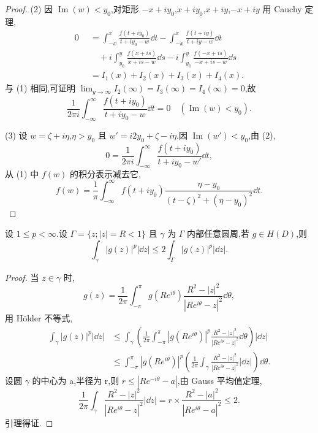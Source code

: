 \begin{proof}
(2) 因 $\operatorname{Im}(w) < y_{0}$,对矩形 $-x + iy_{0}$,$x + iy_{0}$,$x + iy$,$-x + iy$ 用 Cauchy 定理,
\begin{align*}
0 &= \int_{-x}^{x}\frac{f(t + iy_{0})}{t + iy_{0} - w}\dd t - \int_{-x}^{x}\frac{f(t + iy)}{t + iy - w}\dd t \\
&\quad + i\int_{y_{0}}^{y}\frac{f(x + is)}{x + is - w}\dd s - i\int_{y_{0}}^{y}\frac{f(-x + is)}{-x + is - w}\dd s \\
\quad &= I_{1}(x) + I_{2}(x) + I_{3}(x) + I_{4}(x).
\end{align*}
与 (1) 相同,可证明 $\lim_{y \to \infty}I_{2}(\infty) = I_{3}(\infty) = I_{4}(\infty) = 0$,故
\begin{equation*}
\frac{1}{2\pi i}\int_{-\infty}^{\infty}\frac{f(t + iy_{0})}{t + iy_{0} - w}\dd t = 0 \quad (\operatorname{Im}(w) < y_{0}).
\end{equation*}

(3) 设 $w = \zeta + i\eta$,$\eta > y_{0}$ 且 $w' = i2y_{0} + \zeta - i\eta$.因 $\operatorname{Im}(w') < y_{0}$,由 (2),
\begin{equation*}
0 = \frac{1}{2\pi i}\int_{-\infty}^{\infty}\frac{f(t + iy_{0})}{t + iy_{0} - w'}\dd t,
\end{equation*}
从 (1) 中 $f(w)$ 的积分表示减去它,
\begin{equation*}
f(w) = \frac{1}{\pi}\int_{-\infty}^{\infty} f(t + iy_{0})\frac{\eta - y_{0}}{(t - \zeta)^{2} + (\eta - y_{0})^{2}}\dd t.
\end{equation*}
\end{proof}

\begin{lemma}\label{lem:2.20.3}
设 $1 \leq p < \infty$.设 $\Gamma = \{z; |z| = R < 1\}$ 且 $\gamma$ 为 $\Gamma$ 内部任意圆周,若 $g \in H(D)$,则
\begin{equation*}
\int_{\gamma}|g(z)|^{p}|\dd z| \leq 2\int_{\Gamma}|g(z)|^{p}|\dd z|.
\end{equation*}
\end{lemma}

\begin{proof}
当 $z \in \gamma$ 时,
\begin{equation*}
g(z) = \frac{1}{2\pi}\int_{-\pi}^{\pi} g(Re^{i\theta})\frac{R^{2} - |z|^{2}}{|Re^{i\theta} - z|^{2}}\dd \theta,
\end{equation*}
用 Hölder 不等式,
\begin{align*}
\int_{\gamma}|g(z)|^{p}|\dd z|&\leq \int_{\gamma}\left(\frac{1}{2\pi}\int_{-\pi}^{\pi}|g(Re^{i\theta})|^{p}\frac{R^{2} - |z|^{2}}{|Re^{i\theta} - z|^{2}}\dd \theta\right)|\dd z|  \\
&\leq \int_{-\pi}^{\pi}|g(Re^{i\theta})|^{p}\left(\frac{1}{2\pi}\int_{\gamma}\frac{R^{2} - |z|^{2}}{|Re^{i\theta} - z|^{2}}|\dd z|\right)\dd \theta.
\end{align*}
设圆 $\gamma$ 的中心为 a,半径为 r,则 $r \leq |Re^{-i\theta} - a|$,由 Gauss 平均值定理,
\begin{equation*}
\frac{1}{2\pi}\int_{\gamma}\frac{R^{2} - |z|^{2}}{|Re^{i\theta} - z|^{2}}|\dd z| = r \times \frac{R^{2} - |a|^{2}}{|Re^{i\theta} - a|^{2}} \leq 2.
\end{equation*}
引理得证.
\end{proof}

